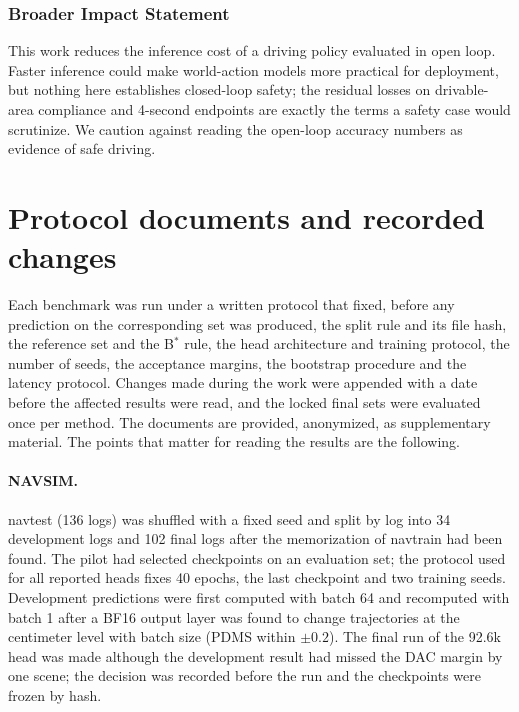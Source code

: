 \documentclass[10pt]{article}
\newcommand{\Bstar}{B$^{*}$}
\begin{document}
\subsubsection*{Broader Impact Statement}
This work reduces the inference cost of a driving policy evaluated in open loop. Faster inference could make world-action models more practical for deployment, but nothing here establishes closed-loop safety; the residual losses on drivable-area compliance and 4-second endpoints are exactly the terms a safety case would scrutinize. We caution against reading the open-loop accuracy numbers as evidence of safe driving.




\appendix

\section{Protocol documents and recorded changes}
\label{app:prereg}

Each benchmark was run under a written protocol that fixed, before any prediction on the corresponding set was produced, the split rule and its file hash, the reference set and the \Bstar{} rule, the head architecture and training protocol, the number of seeds, the acceptance margins, the bootstrap procedure and the latency protocol. Changes made during the work were appended with a date before the affected results were read, and the locked final sets were evaluated once per method. The documents are provided, anonymized, as supplementary material. The points that matter for reading the results are the following.

\paragraph{NAVSIM.} navtest (136 logs) was shuffled with a fixed seed and split by log into 34 development logs and 102 final logs after the memorization of navtrain had been found. The pilot had selected checkpoints on an evaluation set; the protocol used for all reported heads fixes 40 epochs, the last checkpoint and two training seeds. Development predictions were first computed with batch 64 and recomputed with batch 1 after a BF16 output layer was found to change trajectories at the centimeter level with batch size (PDMS within $\pm 0.2$). The final run of the 92.6k head was made although the development result had missed the DAC margin by one scene; the decision was recorded before the run and the checkpoints were frozen by hash.
\end{document}
